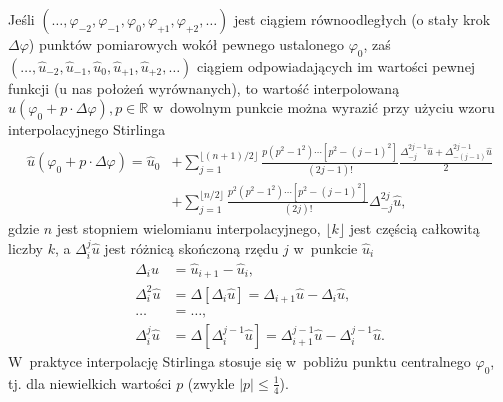 \documentclass[paper=a4,DIV=12]{tmmlab}
\begin{document}
\begin{appendices}
  Jeśli $\left(\dots, \varphi_{-2}, \varphi_{-1}, \varphi_0,
  \varphi_{+1}, \varphi_{+2}, \dots\right)$ jest ciągiem równoodległych
  (o stały krok $\Delta\varphi$) punktów pomiarowych wokół pewnego ustalonego
  $\varphi_0$, zaś $\left( \dots, \hat{u}_{-2}, \hat{u}_{-1}, \hat{u}_0,
  \hat{u}_{+1}, \hat{u}_{+2}, \dots \right)$ ciągiem odpowiadających im
  wartości pewnej funkcji (u nas położeń wyrównanych), to wartość interpolowaną
  $\hat{u}(\varphi_0 + p\cdot \Delta\varphi), p \in \mathbb{R}$ w~dowolnym
  punkcie można wyrazić przy użyciu wzoru interpolacyjnego Stirlinga
  \begin{equation}
    \begin{aligned}
    \hat{u}\left(\varphi_0 + p\cdot \Delta\varphi\right) 
              = \hat{u}_0
            & + \sum_{j=1}^{\lfloor{(n+1)/2}\rfloor}
              \frac{p(p^2-1^2)\cdots \left[p^2-(j-1)^2\right]}{(2j-1)!}
              \frac{\Delta_{-j}^{2j-1}\hat{u} + \Delta_{-(j-1)}^{2j-1}\hat{u}}{2}
              \\
            & + \sum_{j=1}^{\lfloor{n/2}\rfloor}
              \frac{p^2(p^2-1^2)\cdots \left[p^2-(j-1)^2\right]}{(2j)!}
              \Delta_{-j}^{2j}\hat{u},
    \end{aligned}
    \label{eq:ZWO3W}
  \end{equation}
  gdzie $n$ jest stopniem wielomianu interpolacyjnego, $\lfloor{k}\rfloor$
  jest częścią całkowitą liczby $k$, a $\Delta_i^j \hat{u}$ jest różnicą
  skończoną rzędu $j$ w~punkcie $\hat{u}_i$
  \begin{equation}
    \begin{aligned}
      \Delta_i \hat{u}    & = \hat{u}_{i+1} - \hat{u}_i, \\
      \Delta_i^2  \hat{u} & = \Delta[\Delta_i \hat{u}] = \Delta_{i+1} \hat{u} - \Delta_i \hat{u}, \\
      \dots               & = \dots, \\
      \Delta_i^j \hat{u}  & = \Delta[\Delta_i^{j-1}\hat{u}] = \Delta_{i+1}^{j-1} \hat{u} - \Delta_i^{j-1} \hat{u}.
    \end{aligned}
    \label{eq:XONIV}
  \end{equation}
  W~praktyce interpolację Stirlinga stosuje się w~pobliżu punktu centralnego
  $\varphi_0$, tj. dla niewielkich wartości $p$ (zwykle $|p| \le \tfrac{1}{4}$).


\end{appendices}
\end{document}
